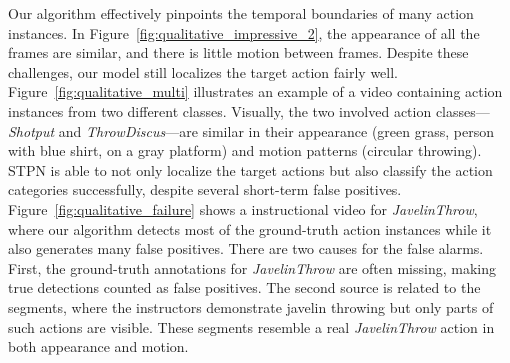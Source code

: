 \documentclass[10pt,twocolumn,letterpaper]{article}
\begin{document}
Our algorithm effectively pinpoints the temporal boundaries of many action instances.
In Figure~\ref{fig:qualitative_impressive_2}, the appearance of all the frames are similar, and there is little motion between frames.
Despite these challenges, our model still localizes the target action fairly well.
Figure~\ref{fig:qualitative_multi} illustrates an example of a video containing action instances from two different classes. 
Visually, the two involved action classes---{\it Shotput} and {\it ThrowDiscus}---are similar in their appearance (green grass, person with blue shirt, on a gray platform) and motion patterns (circular throwing).
STPN is able to not only localize the target actions but also classify the action categories successfully, despite several short-term false positives.
Figure~\ref{fig:qualitative_failure} shows a instructional video for {\it JavelinThrow}, where our algorithm detects most of the ground-truth action instances while it also generates many false positives. 
There are two causes for the false alarms.
First, the ground-truth annotations for {\it JavelinThrow} are often missing, making true detections counted as false positives.
The second source is related to the segments, where the instructors demonstrate javelin throwing but only parts of such actions are visible.
These segments resemble a real {\it JavelinThrow} action in both appearance and motion.
\end{document}
